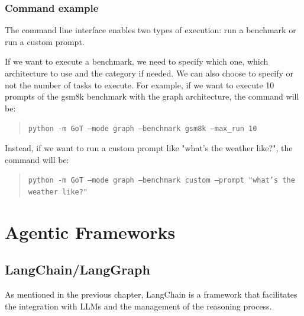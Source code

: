 \documentclass[12pt,a4paper,openright,twoside]{book}
\begin{document}
\subsubsection{Command example}
The command line interface enables two types of execution: run a benchmark or run a custom prompt.

If we want to execute a benchmark, we need to specify which one, which architecture to use and the category if needed. We can also choose to specify or not the number of tasks to execute.
For example, if we want to execute 10 prompts of the gsm8k benchmark with the graph architecture, the command will be:
\begin{quote}
    \item \texttt{python -m GoT --mode graph --benchmark gsm8k --max\_run 10}
\end{quote}
Instead, if we want to run a custom prompt like "what's the weather like?", the command will be:
\begin{quote}
    \item \texttt{python -m GoT --mode graph --benchmark custom --prompt "what's the weather like?"}
\end{quote}

\section{Agentic Frameworks}
\subsection{LangChain/LangGraph}
As mentioned in the previous chapter, LangChain is a framework that facilitates the integration with LLMs and the management of the reasoning process.
\end{document}
